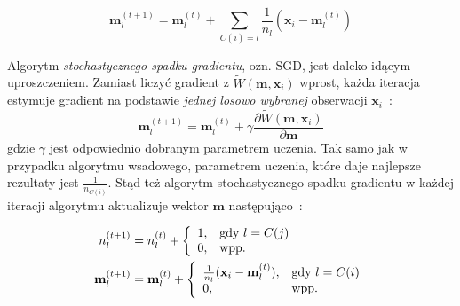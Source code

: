 \documentclass{praca1}
\begin{document}
\begin{equation}
\mathbf{m}_l^{(t+1)} = \mathbf{m}_l^{(t)} + \sum\limits_{C(i) = l}   \frac{1}{n_l}(\mathbf{x}_i - \mathbf{m}^{(t)}_l) %
\end{equation}

Algorytm \emph{stochastycznego spadku gradientu}, ozn. SGD, jest daleko idącym uproszczeniem. Zamiast liczyć gradient z $\widetilde{W}(\mathbf{m}, \mathbf{x}_i)$ wprost, każda iteracja estymuje gradient na podstawie \emph{jednej losowo wybranej} obserwacji $\mathbf{x}_i$~\cite{Bottou2012:sgdtricks}:
\begin{equation}
\mathbf{m}_l^{(t+1)} = \mathbf{m}_l^{(t)} + \gamma \frac{\partial \widetilde{W}(\mathbf{m}, \mathbf{x}_i)}{\partial \mathbf{m}}
\end{equation}
gdzie $\gamma$ jest odpowiednio dobranym parametrem uczenia. Tak samo jak w przypadku algorytmu wsadowego, parametrem uczenia, które daje najlepsze rezultaty jest $\frac{1}{n_{C(i)}}$. Stąd też algorytm stochastycznego spadku gradientu w każdej iteracji algorytmu aktualizuje wektor $\mathbf{m}$ następująco~\cite{Bottou1995:convergenceproperties}:

\begin{align}
n^{(t+1)}_l& = n^{(t)}_l + \left\{
\begin{array}{l l}     
    1, & \text{gdy } l = C(j) \\
    0, & \text{wpp.}
\end{array}\right. \\
\mathbf{m}_l^{(t+1)}& = \mathbf{m}_l^{(t)} + \left\{
\begin{array}{l l}     
    \frac{1}{n_l}(\mathbf{x}_i - \mathbf{m}^{(t)}_l), & \text{gdy } l = C(i) \\
    0, & \text{wpp.}
\end{array}\right.
\end{align}
\end{document}
